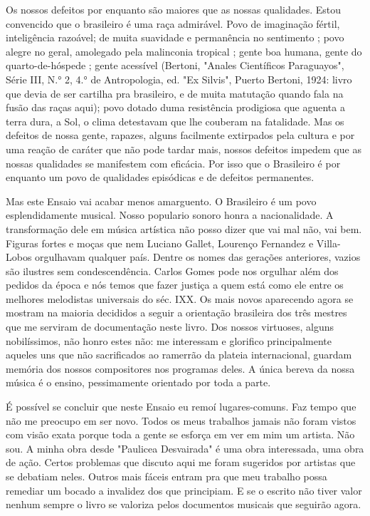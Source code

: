 Os nossos defeitos por enquanto são maiores que as nossas qualidades.
Estou convencido que o brasileiro é uma raça admirável. Povo de
imaginação fértil, inteligência razoável; de muita suavidade e
permanência no sentimento ; povo alegre no geral, amolegado pela
malinconia tropical ; gente boa humana, gente do quarto-de-hóspede ;
gente acessível (Bertoni, "Anales Científicos Paraguayos", Série III,
N.° 2, 4.° de Antropologia, ed. "Ex Silvis", Puerto Bertoni, 1924: livro
que devia de ser cartilha pra brasileiro, e de muita matutação quando
fala na fusão das raças aqui); povo dotado duma resistência prodigiosa
que aguenta a terra dura, a Sol, o clima detestavam que lhe couberam na
fatalidade. Mas os defeitos de nossa gente, rapazes, alguns facilmente
extirpados pela cultura e por uma reação de caráter que não pode tardar
mais, nossos defeitos impedem que as nossas qualidades se manifestem com
eficácia. Por isso que o Brasileiro é por enquanto um povo de qualidades
episódicas e de defeitos permanentes.

Mas este Ensaio vai acabar menos amarguento. O Brasileiro é um povo
esplendidamente musical. Nosso populario sonoro honra a nacionalidade. A
transformação dele em música artística não posso dizer que vai mal não,
vai bem. Figuras fortes e moças que nem Luciano Gallet, Lourenço
Fernandez e Villa-Lobos orgulhavam qualquer país. Dentre os nomes das
gerações anteriores, vazios são ilustres sem condescendência. Carlos
Gomes pode nos orgulhar além dos pedidos da época e nós temos que fazer
justiça a quem está como ele entre os melhores melodistas universais do
séc. IXX. Os mais novos aparecendo agora se mostram na maioria decididos
a seguir a orientação brasileira dos três mestres que me serviram de
documentação neste livro. Dos nossos virtuoses, alguns nobilíssimos, não
honro estes não: me interessam e glorifico principalmente aqueles uns
que não sacrificados ao ramerrão da plateia internacional, guardam
memória dos nossos compositores nos programas deles. A única bereva da
nossa música é o ensino, pessimamente orientado por toda a parte.

É possível se concluir que neste Ensaio eu remoí lugares-comuns. Faz
tempo que não me preocupo em ser novo. Todos os meus trabalhos jamais
não foram vistos com visão exata porque toda a gente se esforça em ver
em mim um artista. Não sou. A minha obra desde "Paulicea Desvairada" é
uma obra interessada, uma obra de ação. Certos problemas que discuto
aqui me foram sugeridos por artistas que se debatiam neles. Outros mais
fáceis entram pra que meu trabalho possa remediar um bocado a invalidez
dos que principiam. E se o escrito não tiver valor nenhum sempre o livro
se valoriza pelos documentos musicais que seguirão agora.


